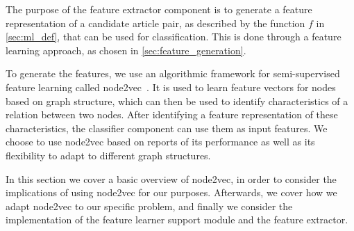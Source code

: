 The purpose of the feature extractor component is to generate a feature representation of a candidate article pair, as described by the function $f$ in \cref{sec:ml_def}, that can be used for classification. This is done through a feature learning approach, as chosen in \cref{sec:feature_generation}.



To generate the features, we use an algorithmic framework for semi-supervised feature learning called node2vec~\cite{node2vec}. It is used to learn feature vectors for nodes based on graph structure, which can then be used to identify characteristics of a relation between two nodes. After identifying a feature representation of these characteristics, the classifier component can use them as input features. We choose to use node2vec based on reports of its performance as well as its flexibility to adapt to different graph structures.

In this section we cover a basic overview of node2vec, in order to consider the implications of using node2vec for our purposes. Afterwards, we cover how we adapt node2vec to our specific problem, and finally we consider the implementation of the feature learner support module and the feature extractor.



